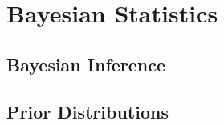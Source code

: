 
\chapter{Bayesian Statistics}
\label{appendixA}

\section{Bayesian Inference}

\section{Prior Distributions}